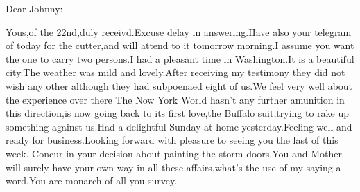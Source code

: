 \documentclass[11pt, oneside]{letter}   	%
\begin{document}
\begin{letter}{}%

\address{26 Broadway \\New York}
\date{November 28th 1887}

\opening{Dear Johnny:}
\setlength{\parindent}{0.5cm}
Yous,of the 22nd,duly receivd.Excuse delay in answering.Have also your telegram of today for the cutter,and will attend to it tomorrow morning.I assume you want the one to carry two persons.I had a pleasant time in Washington.It is a beautiful city.The weather was mild and lovely.After receiving my testimony they did not wish any other although they had subpoenaed eight of us.We feel very well about the experience over there The Now York World hasn't any further amunition in this direction,is now going back to its first love,the Buffalo suit,trying to rake up something against us.Had a delightful Sunday at home yesterday.Feeling well and ready for business.Looking forward with pleasure to seeing you the last of this week.
Concur in your decision about painting the storm doors.You and Mother will surely have your own way in all these affairs,what's the use of my saying a word.You are monarch of all you survey.


\end{letter}
\end{document}
